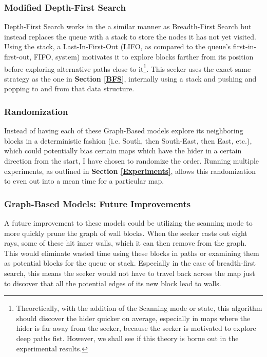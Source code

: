 \documentclass[12pt]{article}
\begin{document}
\subsubsection{Modified Depth-First Search}
Depth-First Search works in the a similar manner as Breadth-First Search but instead replaces the queue with a stack to store the nodes it has not yet visited. Using the stack, a Last-In-First-Out (LIFO, as compared to the queue's first-in-first-out, FIFO, system) motivates it to explore blocks farther from its position before exploring alternative paths close to it\footnote{Theoretically, with the addition of the Scanning mode or state, this algorithm should discover the hider quicker on average, especially in maps where the hider is far away from the seeker, because the seeker is motivated to explore deep paths fist. However, we shall see if this theory is borne out in the experimental results.}. This seeker uses the exact same strategy as the one in \textbf{Section \ref{BFS}}, internally using a stack and pushing and popping to and from that data structure.

\subsubsection{Randomization}
Instead of having each of these Graph-Based models explore its neighboring blocks in a deterministic fashion (i.e. South, then South-East, then East, etc.), which could potentially bias certain maps which have the hider in a certain direction from the start, I have chosen to randomize the order. Running multiple experiments, as outlined in \textbf{Section \ref{Experiments}}, allows this randomization to even out into a mean time for a particular map.

\subsubsection{Graph-Based Models: Future Improvements}
A future improvement to these models could be utilizing the scanning mode to more quickly prune the graph of wall blocks. When the seeker casts out eight rays, some of these hit inner walls, which it can then remove from the graph. This would eliminate wasted time using these blocks in paths or examining them as potential blocks for the queue or stack. Especially in the case of breadth-first search, this means the seeker would not have to travel back across the map just to discover that all the potential edges of its new block lead to walls.
\end{document}
